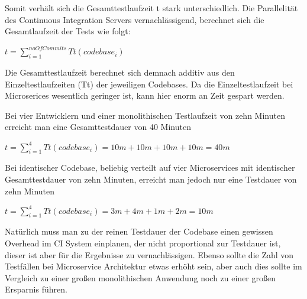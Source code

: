 Somit verhält sich die Gesamttestlaufzeit t stark unterschiedlich. Die Parallelität des Continuous Integration Servers vernachlässigend, berechnet sich die Gesamtlaufzeit der Tests wie folgt:

$ t = \displaystyle\sum_{i=1}^{noOfCommits} Tt(codebase_i) $

Die Gesamttestlaufzeit berechnet sich demnach additiv aus den Einzeltestlaufzeiten (Tt) der jeweiligen Codebases. Da die Einzeltestlaufzeit bei Microserices wesentlich geringer ist, kann hier enorm an Zeit gespart werden.

Bei vier Entwicklern und einer monolithischen Testlaufzeit von zehn Minuten erreicht man eine Gesamttestdauer von 40 Minuten

$ t = \displaystyle\sum_{i=1}^{4} Tt(codebase_i) = 10m + 10m + 10m + 10m = 40m $

Bei identischer Codebase, beliebig verteilt auf vier Microservices mit identischer Gesamttestdauer von zehn Minuten, erreicht man jedoch nur eine Testdauer von zehn Minuten 

$ t = \displaystyle\sum_{i=1}^{4} Tt(codebase_i) = 3m + 4m + 1m + 2m = 10m $

Natürlich muss man zu der reinen Testdauer der Codebase einen gewissen Overhead im CI System einplanen, der nicht proportional zur Testdauer ist, dieser ist aber für die Ergebnisse zu vernachlässigen. Ebenso sollte die Zahl von Testfällen bei Microservice Architektur etwas erhöht sein, aber auch dies sollte im Vergleich zu einer großen monolithischen Anwendung noch zu einer großen Ersparnis führen.

